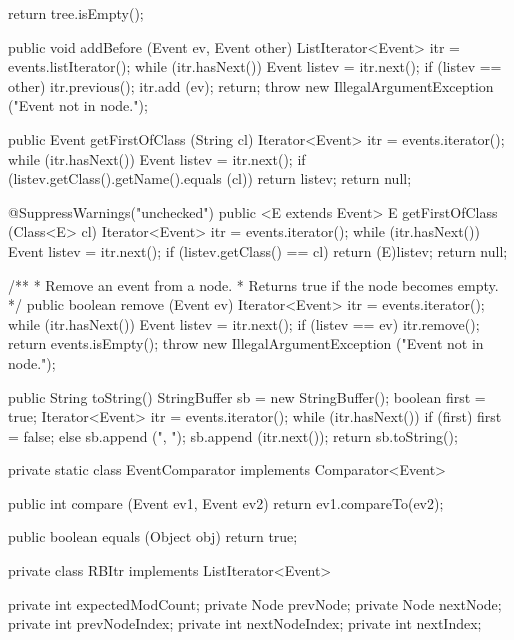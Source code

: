 \begin{hide}
\begin{code}
\begin{hide} {
      return tree.isEmpty();
   }
{      public void addBefore (Event ev, Event other) {
         ListIterator<Event> itr = events.listIterator();
         while (itr.hasNext()) {
            Event listev = itr.next();
            if (listev == other) {
               itr.previous();
               itr.add (ev);
               return;
            }
         }
         throw new IllegalArgumentException ("Event not in node.");
      }

      public Event getFirstOfClass (String cl) {
         Iterator<Event> itr = events.iterator();
         while (itr.hasNext()) {
            Event listev = itr.next();
            if (listev.getClass().getName().equals (cl))
               return listev;
         }
         return null;
      }

      @SuppressWarnings("unchecked")
      public <E extends Event> E getFirstOfClass (Class<E> cl) {
         Iterator<Event> itr = events.iterator();
         while (itr.hasNext()) {
            Event listev = itr.next();
            if (listev.getClass() == cl)
               return (E)listev;
         }
         return null;
      }

      /**
       * Remove an event from a node.
       * Returns true if the node becomes empty.
       */
      public boolean remove (Event ev) {
         Iterator<Event> itr = events.iterator();
         while (itr.hasNext()) {
            Event listev = itr.next();
            if (listev == ev) {
               itr.remove();
               return events.isEmpty();
            }
         }
         throw new IllegalArgumentException ("Event not in node.");
      }

      public String toString() {
         StringBuffer sb = new StringBuffer();
         boolean first = true;
         Iterator<Event> itr = events.iterator();
         while (itr.hasNext()) {
            if (first)
               first = false;
            else
               sb.append (", ");
            sb.append (itr.next());
         }
         return sb.toString();
      }
   }

   private static class EventComparator implements Comparator<Event> {
      public int compare (Event ev1, Event ev2) {
         return ev1.compareTo(ev2);
      }

      public boolean equals (Object obj) { return true; }
   }

   private class RBItr implements ListIterator<Event> {
      private int expectedModCount;
      private Node prevNode;
      private Node nextNode;
      private int prevNodeIndex;
      private int nextNodeIndex;
      private int nextIndex;

}
\end{hide}
\end{code}
\end{hide}

